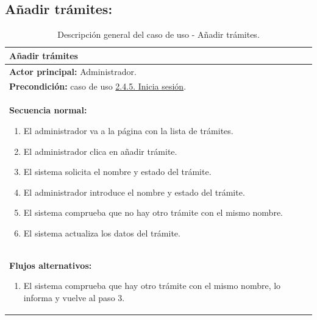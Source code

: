 \documentclass[12pt, a4paper, twoside]{report}
\begin{document}
        \subsection{Añadir trámites:}
            \begin{table}[H]
            \centering
            \begin{tabular}{|p{16cm}|} 
            \hline
            \textbf{Añadir trámites} \\ \hline
            \textbf{Actor principal:} Administrador. \\ \hline
            \textbf{Precondición:} caso de uso \hyperref[subsec:2.4.5.]{2.4.5. Inicia sesión}. \\ \hline
            \textbf{Secuencia normal:}
                \begin{enumerate}
                    \item El administrador va a la página con la lista de trámites.
                    \item El administrador clica en añadir trámite.
                    \item El sistema solicita el nombre y estado del trámite.
                    \item El administrador introduce el nombre y estado del trámite.
                    \item El sistema comprueba que no hay otro trámite con el mismo nombre.
                    \item El sistema actualiza los datos del trámite.
                \end{enumerate} \\ \hline
            \textbf{Flujos alternativos:}
                \begin{enumerate}
                    \item[5.a.] El sistema comprueba que hay otro trámite con el mismo nombre, lo informa y vuelve al paso 3.
                \end{enumerate} \\ \hline
            \end{tabular}
            \caption{Descripción general del caso de uso - Añadir trámites.}
            \end{table}
\end{document}
